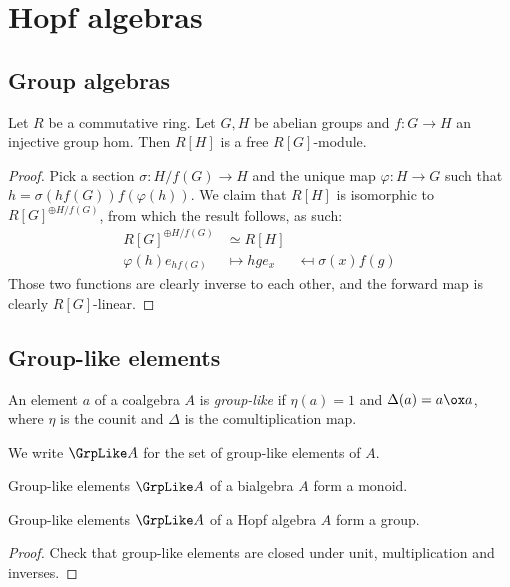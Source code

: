 \section{Hopf algebras}


\subsection{Group algebras}


\begin{proposition}
  \label{0-grp-alg-free}
  \uses{}

  Let $R$ be a commutative ring.
  Let $G, H$ be abelian groups and $f : G \to H$ an injective group hom.
  Then $R[H]$ is a free $R[G]$-module.
\end{proposition}
\begin{proof}
  \uses{}

  Pick a section $\sigma : H / f(G) \to H$ and the unique map $\varphi : H \to G$
  such that $h = \sigma(h f(G)) f(\varphi(h))$.
  We claim that $R[H]$ is isomorphic to $R[G]^{\oplus H / f(G)}$, from which the result follows,
  as such:
  \begin{align*}
    R[G]^{\oplus H / f(G)} & \simeq R[H] \\
    \varphi(h) e_{h f(G)} & \mapsto h
    g e_x & \mapsfrom \sigma(x) f(g)
  \end{align*}
  Those two functions are clearly inverse to each other,
  and the forward map is clearly $R[G]$-linear.
\end{proof}



\subsection{Group-like elements}


\begin{definition}
  \label{0-grp-like}
  \uses{}
  \leanok

  An element $a$ of a coalgebra $A$ is \emph{group-like} if $\eta(a) = 1$ and $\Delta(a) = a \ox a$,
  where $\eta$ is the counit and $\Delta$ is the comultiplication map.

  We write $\GrpLike A$ for the set of group-like elements of $A$.
\end{definition}


\begin{proposition}
  \label{0-grp-like-grp}
  \leanok

  Group-like elements $\GrpLike A$ of a bialgebra $A$ form a monoid.

  Group-like elements $\GrpLike A$ of a Hopf algebra $A$ form a group.
\end{proposition}
\begin{proof}
  \uses{}
  \leanok

  Check that group-like elements are closed under unit, multiplication and inverses.
\end{proof}


